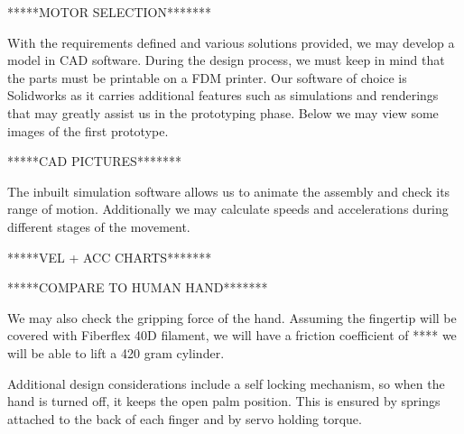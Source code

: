 \documentclass{article}
\begin{document}
*****MOTOR SELECTION*******\vspace{30pt}

With the requirements defined and various solutions provided, we may develop a model in CAD software. During the design process, we must keep in mind that the parts must be printable on a FDM printer. Our software of choice is Solidworks as it carries additional features such as simulations and renderings that may greatly assist us in the prototyping phase. Below we may view some images of the first prototype.

*****CAD PICTURES*******\vspace{30pt}


The inbuilt simulation software allows us to animate the assembly and check its range of motion. Additionally we may calculate speeds and accelerations during different stages of the movement.

*****VEL + ACC CHARTS*******\vspace{30pt}

*****COMPARE TO HUMAN HAND*******\vspace{30pt}

We may also check the gripping force of the hand. Assuming the fingertip will be covered with Fiberflex 40D filament, we will have a friction coefficient of  **** we will be able to lift a 420 gram cylinder.


Additional design considerations include a self locking mechanism, so when the hand is turned off, it keeps the open palm position. This is ensured by springs attached to the back of each finger and by servo holding torque.
\end{document}
